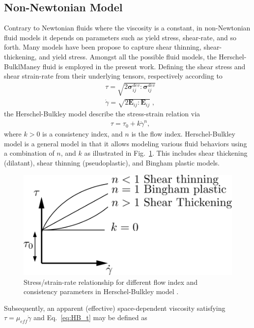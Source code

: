 \subsection{Non-Newtonian Model}\label{sec:NonNewtonian}
Contrary to Newtonian fluids where the viscosity is a constant, in non-Newtonian fluid models it depends on parameters such as yield stress, shear-rate, and so forth. Many models have been propose to capture shear thinning, shear-thickening, and yield stress. Amongst all the possible fluid models, the Herschel-BulklManey fluid is employed in the present work. Defining the shear stress and shear strain-rate from their underlying tensors, respectively according to
\begin{align}
& \tau = \sqrt{2 \boldsymbol{\bm{\sigma}}^{dev}_{ij} : \boldsymbol{\bm {\sigma}}^{dev}_{ij}}\label{eq:tau}\\
& \dot{\gamma} = \sqrt{2 {\boldsymbol E}_{ij} : {\boldsymbol E}_{ij}}\; \label{eq:gamma_dot},
\end{align}
the Herschel-Bulkley model describe the stress-strain relation via  
\begin{align}
& \tau = \tau_0+k\dot{\gamma}^n,
\label{eq:HB_t}
\end{align}
where $k>0$ is a consistency index, and $n$ is the flow index. Herschel-Bulkley model is a general model in that it allows modeling various fluid behaviors using a combination of $n$, and $k$ as illustrated in Fig.~\ref{fig:HB}. This includes shear thickening (dilatant), shear thinning (pseudoplastic), and Bingham plastic models.
\begin{figure}[H]
	\begin{center}
		\includegraphics[width=.6\linewidth]{images/Non-newtonian.png}
	\end{center}
	\caption{Stress/strain-rate relationship for different flow index and consistency parameters in Herschel-Bulkley model \cite{ragui2018progress}.}
	\label{fig:HB}
\end{figure}
Subsequently, an apparent (effective) space-dependent viscosity satisfying $\tau = \mu_{eff}\dot{\gamma}$ and Eq.~\ref{eq:HB_t} may be defined \cite{WALLEVIK201495} as
